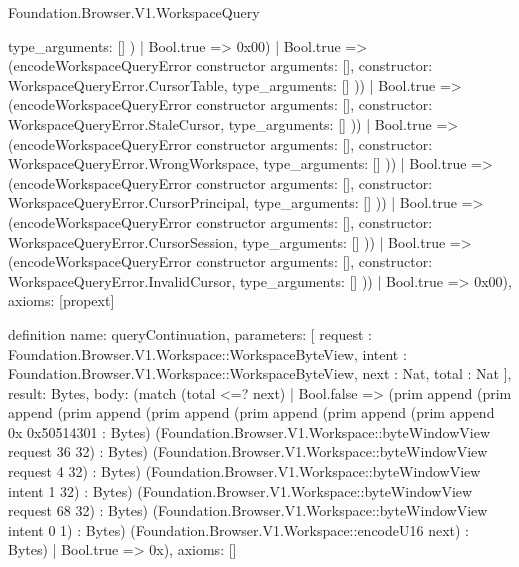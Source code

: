 \begin{lexlean}{Foundation.Browser.V1.WorkspaceQuery}
\begin{semanticmodule}
{{                    type_arguments: []
                  })
                  | Bool.true => 0x00)
                | Bool.true => (encodeWorkspaceQueryError constructor{
                  arguments: [],
                  constructor: WorkspaceQueryError.CursorTable,
                  type_arguments: []
                }))
              | Bool.true => (encodeWorkspaceQueryError constructor{
                arguments: [],
                constructor: WorkspaceQueryError.StaleCursor,
                type_arguments: []
              }))
            | Bool.true => (encodeWorkspaceQueryError constructor{
              arguments: [],
              constructor: WorkspaceQueryError.WrongWorkspace,
              type_arguments: []
            }))
          | Bool.true => (encodeWorkspaceQueryError constructor{
            arguments: [],
            constructor: WorkspaceQueryError.CursorPrincipal,
            type_arguments: []
          }))
        | Bool.true => (encodeWorkspaceQueryError constructor{
          arguments: [],
          constructor: WorkspaceQueryError.CursorSession,
          type_arguments: []
        }))
      | Bool.true => (encodeWorkspaceQueryError constructor{
        arguments: [],
        constructor: WorkspaceQueryError.InvalidCursor,
        type_arguments: []
      }))
    | Bool.true => 0x00),
  axioms: [propext]
}

definition{
  name: queryContinuation,
  parameters: [
    request : Foundation.Browser.V1.Workspace::WorkspaceByteView,
    intent : Foundation.Browser.V1.Workspace::WorkspaceByteView,
    next : Nat,
    total : Nat
  ],
  result: Bytes,
  body: (match (total <=? next)
    | Bool.false => (prim append (prim append (prim append (prim append (prim append (prim append (prim append 0x 0x50514301 : Bytes) (Foundation.Browser.V1.Workspace::byteWindowView request 36 32) : Bytes) (Foundation.Browser.V1.Workspace::byteWindowView request 4 32) : Bytes) (Foundation.Browser.V1.Workspace::byteWindowView intent 1 32) : Bytes) (Foundation.Browser.V1.Workspace::byteWindowView request 68 32) : Bytes) (Foundation.Browser.V1.Workspace::byteWindowView intent 0 1) : Bytes) (Foundation.Browser.V1.Workspace::encodeU16 next) : Bytes)
    | Bool.true => 0x),
  axioms: []
}


\end{semanticmodule}
\end{lexlean}
